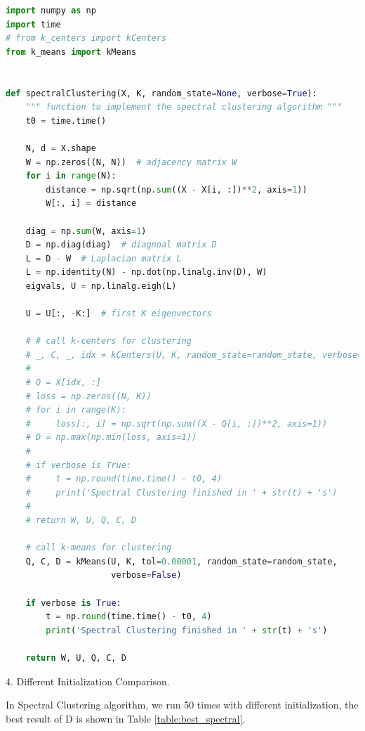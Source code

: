 \begin{description}
\begin{description}
\begin{lstlisting}[language=Python, caption=Spectral Clustering Algorithm Python Code]
import numpy as np
import time
# from k_centers import kCenters
from k_means import kMeans


def spectralClustering(X, K, random_state=None, verbose=True):
    """ function to implement the spectral clustering algorithm """
    t0 = time.time()

    N, d = X.shape
    W = np.zeros((N, N))  # adjacency matrix W
    for i in range(N):
        distance = np.sqrt(np.sum((X - X[i, :])**2, axis=1))
        W[:, i] = distance

    diag = np.sum(W, axis=1)
    D = np.diag(diag)  # diagnoal matrix D
    L = D - W  # Laplacian matrix L
    L = np.identity(N) - np.dot(np.linalg.inv(D), W)
    eigvals, U = np.linalg.eigh(L)

    U = U[:, -K:]  # first K eigenvectors

    # # call k-centers for clustering
    # _, C, _, idx = kCenters(U, K, random_state=random_state, verbose=False)
    #
    # Q = X[idx, :]
    # loss = np.zeros((N, K))
    # for i in range(K):
    #     loss[:, i] = np.sqrt(np.sum((X - Q[i, :])**2, axis=1))
    # D = np.max(np.min(loss, axis=1))
    #
    # if verbose is True:
    #     t = np.round(time.time() - t0, 4)
    #     print('Spectral Clustering finished in ' + str(t) + 's')
    #
    # return W, U, Q, C, D

    # call k-means for clustering
    Q, C, D = kMeans(U, K, tol=0.00001, random_state=random_state,
                     verbose=False)

    if verbose is True:
        t = np.round(time.time() - t0, 4)
        print('Spectral Clustering finished in ' + str(t) + 's')

    return W, U, Q, C, D
\end{lstlisting}


\item{4.} Different Initialization Comparison.

In Spectral Clustering algorithm, we run 50 times with different initialization, the best result of D is shown in Table \ref{table:best_spectral}.


\end{description}
\end{description}
